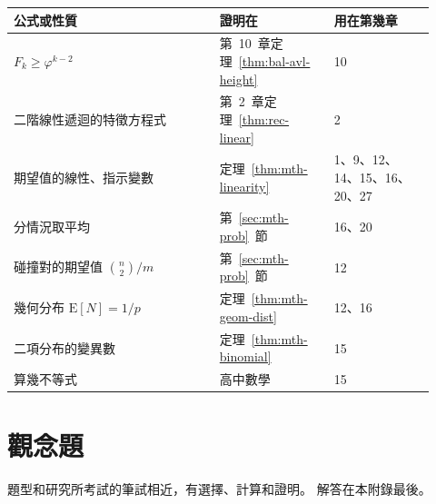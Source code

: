 \begin{center}
\small
\begin{tabular}{p{0.45\linewidth}p{0.25\linewidth}p{0.22\linewidth}}
\toprule
公式或性質 & 證明在 & 用在第幾章 \\
\midrule
$F_k \ge \varphi^{k-2}$ & 第~10~章定理~\ref{thm:bal-avl-height} & 10 \\
二階線性遞迴的特徵方程式 & 第~2~章定理~\ref{thm:rec-linear} & 2 \\
期望值的線性、指示變數 & 定理~\ref{thm:mth-linearity} & 1、9、12、14、15、16、20、27 \\
分情況取平均 & 第~\ref{sec:mth-prob}~節 & 16、20 \\
碰撞對的期望值 $\binom{n}{2}/m$ & 第~\ref{sec:mth-prob}~節 & 12 \\
幾何分布 $\mathrm{E}[N] = 1/p$ & 定理~\ref{thm:mth-geom-dist} & 12、16 \\
二項分布的變異數 & 定理~\ref{thm:mth-binomial} & 15 \\
算幾不等式 & 高中數學 & 15 \\
\bottomrule
\end{tabular}
\end{center}

\section{觀念題}
\label{sec:mth-exercises}

題型和研究所考試的筆試相近，有選擇、計算和證明。 解答在本附錄最後。

